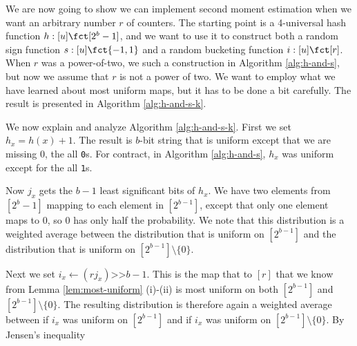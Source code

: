 We are now going to show we can implement second moment estimation when
we want an arbitrary number $r$ of counters. The starting point
is a 4-universal hash function $h:[u]\fct[2^b-1]$, and we want to
use it to construct both a random sign function $s:[u]\fct\{-1,1\}$ and 
a random bucketing function $i:[u]\fct[r]$. When $r$ was a power-of-two, 
we such a construction in Algorithm \ref{alg:h-and-s}, but now we
assume that $r$ is not a power of two. We want to employ what we
have learned about most uniform maps, but it has to be done a bit
carefully. The result is presented in Algorithm \ref{alg:h-and-s-k}.

We now explain and analyze Algorithm \ref{alg:h-and-s-k}. First we set
$h_x=h(x)+1$.  The result is $b$-bit string that is uniform except
that we are missing 0, the all \texttt0s. For contract, in Algorithm
\ref{alg:h-and-s}, $h_x$ was uniform except for the all
\texttt1s. 

Now $j_x$ gets the $b-1$ least significant bits of
$h_x$. We have two elements from $[2^b-1]$ mapping to each element in
$[2^{b-1}]$, except that only one element maps to $0$, so $0$ has only
half the probability. We note that this distribution is a weighted
average between the distribution that is uniform on $[2^{b-1}]$ and
the distribution that is uniform on $[2^{b-1}]\setminus\{0\}$.

Next we set $i_x\gets (rj_x)\texttt{>>}b-1$. This is the map that
to $[r]$ that we know from Lemma \ref{lem:most-uniform} (i)-(ii) 
is most uniform on both $[2^{b-1}]$ and $[2^{b-1}]\setminus\{0\}$.
The resulting distribution is therefore again a weighted average
between if $i_x$ was uniform on $[2^{b-1}]$ and
if $i_x$ was uniform on $[2^{b-1}]\setminus\{0\}$. By Jensen's inequality





